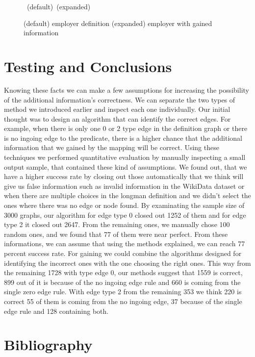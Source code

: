 \documentclass[twoside,b5paper,10pt]{article}
\begin{document}
\begin{figure}[htb]
{{    }
  }
  \vspace{3pt}
  \hbox{\hspace{0.13\columnwidth} (default) \hspace{0.3\columnwidth} (expanded)}
  \caption{ (default) employer definition (expanded) employer with gained information}
  \label{fig:employer}
\end{figure}

\section{Testing and Conclusions}
\label{sec:Testing}
Knowing these facts we can make a few assumptions for increasing the possibility of the additional information's correctness. 
We can separate the two types of method we introduced earlier and inspect each one individually. Our initial thought was to design an algorithm
that can identify the correct edges. For example, when there is only one $0$ or $2$ type edge in the definition
graph or there is no ingoing edge to the predicate, there is a higher chance that the additional information that we gained by the mapping will be correct.
Using these techniques we performed quantitative evaluation by manually inspecting a small output sample, that contained these kind of assumptions.
We found out, that we have a higher success rate by closing out those automatically that we think will give us false information such as invalid information
in the WikiData dataset or when there are multiple choices in the longman definition and we didn't select the ones where there was no edge or node found. By examinating the sample size of 3000 graphs, our algorithm for edge type 0
closed out 1252 of them and for edge type 2 it closed out 2647. From the remaining ones, we manually chose 100 random ones, and we found that
77 of them were near perfect. From these informations, we can assume that using the methods explained, we can reach 77 percent success rate.
For gaining we could combine the algorithms designed for identifying the incorrect ones with the one choosing the right ones. 
This way from the remaining 1728 with type edge 0, our methods suggest that 1559 is correct, 899 out of it is because of the no ingoing edge rule and 660 is coming from the single zero edge rule.
With edge type 2 from the remaining 353 we think 220 is correct 55 of them is coming from the no ingoing edge, 37 because of the single edge rule and 128 containing both. 


\section{Bibliography}
\label{sec:bib}
\end{document}
